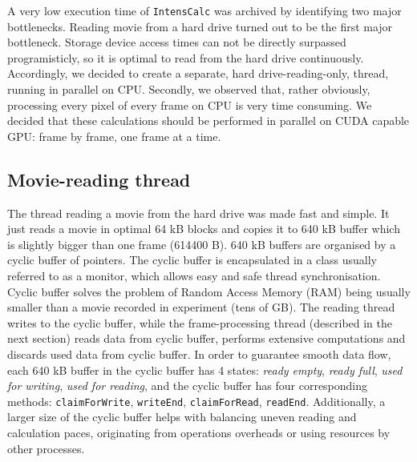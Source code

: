 \documentclass[12pt,dvips]{elsarticle}
\begin{document}
A very low execution time of \verb"IntensCalc" was archived by identifying two major bottlenecks. Reading movie from a
hard drive turned out to be the first major bottleneck. Storage device access times can not be directly surpassed
programisticly, so it is optimal to read from the hard drive continuously. Accordingly, we decided to create a separate,
hard drive-reading-only, thread, running in parallel on CPU. Secondly, we observed that, rather obviously, processing
every pixel of every frame on CPU is very time consuming. We decided that these calculations should be performed in
parallel on CUDA capable GPU: frame by frame, one frame at a time.

\subsection{Movie-reading thread} The thread reading a movie from the hard drive was made fast and simple. It just reads
a movie in optimal 64 kB blocks and copies it to 640 kB buffer which is slightly bigger than one frame (614400 B). 640 kB
buffers are organised by a cyclic buffer of pointers. The cyclic buffer is encapsulated in a class usually referred to as
a monitor, which allows easy and safe thread synchronisation. Cyclic buffer solves the problem of Random Access Memory
(RAM) being usually smaller than a movie recorded in experiment (tens of GB). The reading thread writes to the cyclic
buffer, while the frame-processing thread (described in the next section) reads data from cyclic buffer, performs
extensive computations and discards used data from cyclic buffer. In order to guarantee smooth data flow, each 640 kB
buffer in the cyclic buffer has 4 states: \textit{ready empty}, \textit{ready full}, \textit{used for writing},
\textit{used for reading}, and the cyclic buffer has four corresponding methods: \verb"claimForWrite", \verb"writeEnd",
\verb"claimForRead", \verb"readEnd". Additionally, a larger size of the cyclic buffer helps with balancing uneven reading
and calculation paces, originating from operations overheads or using resources by other processes.
\end{document}
